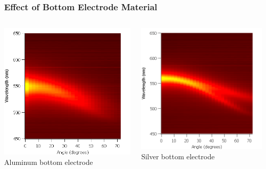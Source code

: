 \documentclass{beamer}
\begin{document}
        \begin{frame}
            \frametitle{Effect of Bottom Electrode Material}
            \begin{columns}
				\begin{column}{0.5\textwidth}
					\centering
					\includegraphics[width=\textwidth]{images/n1_ag_top_heatmap.png}
					Aluminum bottom electrode
				\end{column}
				\begin{column}{0.5\textwidth}
					\centering
					\includegraphics[width=\textwidth]{images/n1_al_top_heatmap.png}
					Silver bottom electrode
				\end{column}


            \end{columns}

        \end{frame}
        
\end{document}
